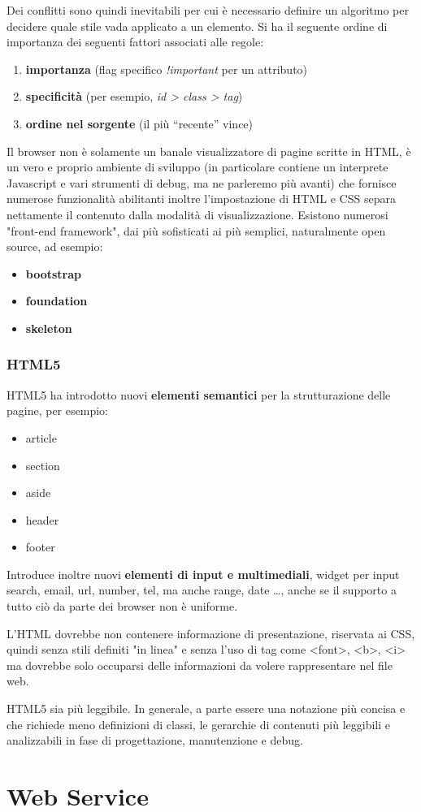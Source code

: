 \documentclass[a4paper,12pt, oneside]{book}
\begin{document}
Dei conflitti sono quindi inevitabili per cui è necessario definire un algoritmo per decidere quale
stile vada applicato a un elemento.\newline
Si ha il seguente ordine di importanza dei seguenti fattori associati alle regole:
\begin{enumerate}
	\item \textbf{importanza} (flag specifico \textit{!important} per un attributo)
	\item \textbf{specificità} (per esempio, \textit{id > class > tag})
	\item \textbf{ordine nel sorgente }(il più “recente” vince)
\end{enumerate}
Il browser non è solamente un banale visualizzatore di pagine scritte in HTML, è un vero e proprio 
ambiente di sviluppo (in particolare contiene un interprete Javascript e vari strumenti di debug,
ma ne parleremo più avanti) che fornisce numerose funzionalità abilitanti inoltre l'impostazione di
HTML e CSS separa nettamente il contenuto dalla modalità di visualizzazione.\newline
Esistono numerosi "front-end framework", dai più sofisticati ai più semplici, naturalmente open source, ad esempio:
\begin{itemize}
	\item \textbf{bootstrap}
	\item \textbf{foundation}
	\item \textbf{skeleton}
\end{itemize}

\subsection{HTML5}
HTML5 ha introdotto nuovi \textbf{elementi semantici} per la strutturazione delle pagine, per esempio:
\begin{itemize}
	\item article
	\item section
	\item aside
	\item header
	\item footer
\end{itemize}
Introduce inoltre nuovi \textbf{elementi di input e multimediali}, widget per input search, email,
url, number, tel, ma anche range, date \dots,  anche se il supporto a tutto ciò da parte dei browser non è uniforme.

L’HTML dovrebbe non contenere informazione di presentazione, riservata ai CSS, 
quindi senza stili definiti "in linea" e senza l'uso di tag come <font>, <b>, <i> ma dovrebbe solo 
occuparsi delle informazioni da volere rappresentare nel file web.

HTML5 sia più leggibile. In generale, a parte essere una notazione più concisa e che richiede
meno definizioni di classi, le gerarchie di contenuti più leggibili e analizzabili 
in fase di progettazione, manutenzione e debug.
\chapter{Web Service}
\end{document}
